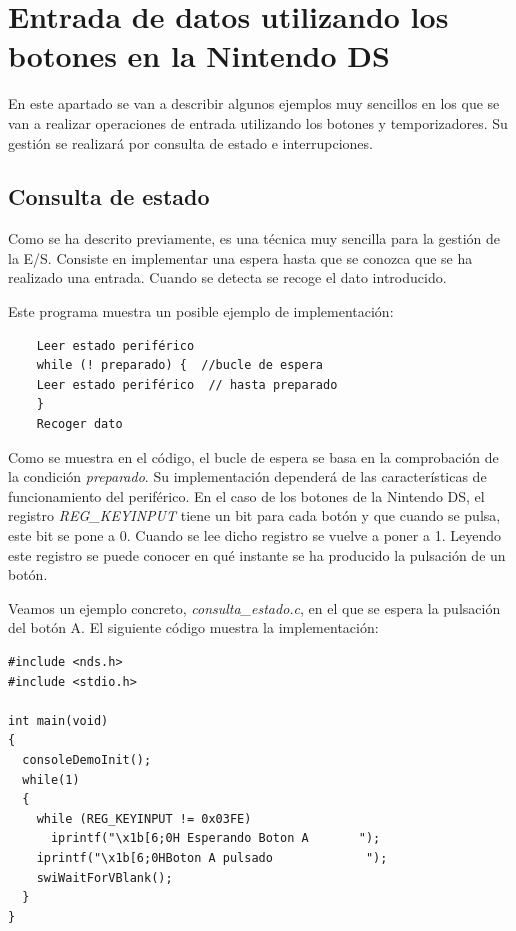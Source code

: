 \section{Entrada de datos utilizando los botones en la Nintendo DS}
En este apartado se van a describir algunos ejemplos muy  sencillos  en los que se van a realizar operaciones de entrada utilizando los botones y temporizadores. Su gestión se realizará por consulta de estado e interrupciones. 

\subsection{Consulta de estado}
Como se ha descrito previamente, es una técnica muy sencilla para la gestión de la E/S.
Consiste en implementar una espera hasta que se conozca que se ha realizado una entrada. Cuando se detecta se recoge el dato introducido. 

Este programa muestra un posible ejemplo de implementación:  
\begin{small}
	\begin{verbatim}
	Leer estado periférico
	while (! preparado) {  //bucle de espera
	Leer estado periférico  // hasta preparado
	}
	Recoger dato
	\end{verbatim}
\end{small}

Como se muestra en el código, el bucle de espera se basa en la comprobación de la condición \textit{preparado}. Su implementación dependerá de las características de funcionamiento del periférico. En el caso de los botones de la Nintendo DS, el registro \textit {REG\_KEYINPUT} tiene un bit para cada  botón y que cuando se pulsa, este bit se pone a 0. Cuando se lee dicho registro  se vuelve a poner a 1. Leyendo este registro se puede conocer en qué instante se ha producido la pulsación de un botón.

\begin{example}
Veamos un ejemplo concreto, \textit{consulta\_estado.c}, en el que se espera la pulsación del botón A. El siguiente código muestra la implementación:

\begin{lstlisting}
#include <nds.h>
#include <stdio.h>

int main(void)
{
  consoleDemoInit();
  while(1) 
  {
    while (REG_KEYINPUT != 0x03FE)
      iprintf("\x1b[6;0H Esperando Boton A       ");
    iprintf("\x1b[6;0HBoton A pulsado             ");
    swiWaitForVBlank();
  }
}
\end{lstlisting}
\end{example}

